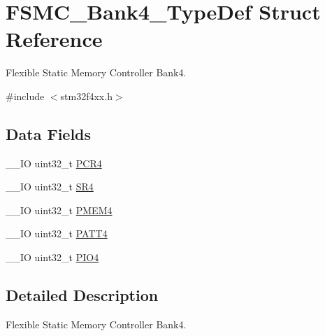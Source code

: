 \hypertarget{struct_f_s_m_c___bank4___type_def}{\section{F\-S\-M\-C\-\_\-\-Bank4\-\_\-\-Type\-Def Struct Reference}
\label{struct_f_s_m_c___bank4___type_def}
}


Flexible Static Memory Controller Bank4.  




{\ttfamily \#include $<$stm32f4xx.\-h$>$}

\subsection*{Data Fields}
\begin{DoxyCompactItemize}
\item 
\-\_\-\-\_\-\-I\-O uint32\-\_\-t \hyperlink{struct_f_s_m_c___bank4___type_def_a2f02e7acfbd7e549ede84633215eb6a1}{P\-C\-R4}
\item 
\-\_\-\-\_\-\-I\-O uint32\-\_\-t \hyperlink{struct_f_s_m_c___bank4___type_def_a8218d6e11dae5d4468c69303dec0b4fc}{S\-R4}
\item 
\-\_\-\-\_\-\-I\-O uint32\-\_\-t \hyperlink{struct_f_s_m_c___bank4___type_def_a3f82cc749845fb0dd7dfa8121d96b663}{P\-M\-E\-M4}
\item 
\-\_\-\-\_\-\-I\-O uint32\-\_\-t \hyperlink{struct_f_s_m_c___bank4___type_def_a955cad1aab7fb2d5b6e216cb29b5e7e2}{P\-A\-T\-T4}
\item 
\-\_\-\-\_\-\-I\-O uint32\-\_\-t \hyperlink{struct_f_s_m_c___bank4___type_def_ac53cd7a08093a4ae8f4de4bcff67a64f}{P\-I\-O4}
\end{DoxyCompactItemize}


\subsection{Detailed Description}
Flexible Static Memory Controller Bank4. 

